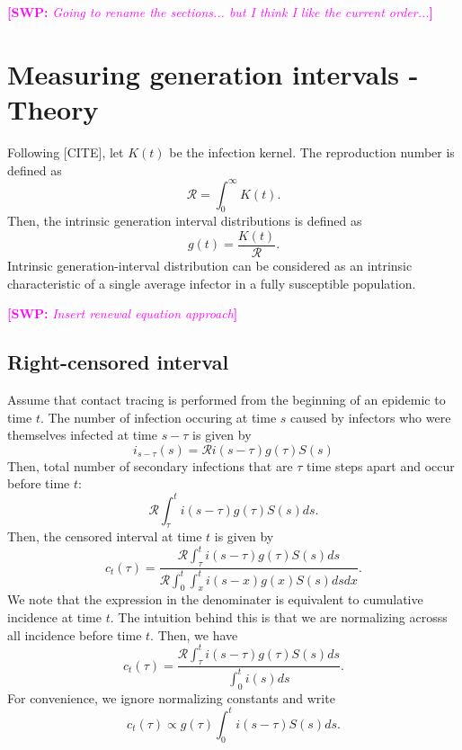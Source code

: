 \documentclass{article}
\newcommand{\RR}{\ensuremath{{\mathcal R}}}
\newcommand{\comment}[3]{\textcolor{#1}{\textbf{[#2: }\textsl{#3}\textbf{]}}}
\newcommand{\swp}[1]{\comment{magenta}{SWP}{#1}}
\begin{document}
\swp{Going to rename the sections... but I think I like the current order...}
\section{Measuring generation intervals - Theory}

Following [CITE], let $K(t)$ be the infection kernel. 
The reproduction number is defined as
$$
\RR = \int_0^\infty K(t).
$$
Then, the intrinsic generation interval distributions is defined as
$$
g(t) = \frac{K(t)}{\RR}.
$$
Intrinsic generation-interval distribution can be considered as an intrinsic characteristic of a single average infector in a fully susceptible population.

\swp{Insert renewal equation approach}

\subsection{Right-censored interval}

Assume that contact tracing is performed from the beginning of an epidemic to time $t$.
The number of infection occuring at time $s$ caused by infectors who were themselves infected at time $s-\tau$ is given by
\begin{equation}
i_{s-\tau}(s) = \RR i(s-\tau) g(\tau) S(s)
\end{equation}
Then, total number of secondary infections that are $\tau$ time steps apart and occur before time $t$:
\begin{equation}
\RR \int_\tau^t i(s-\tau) g(\tau) S(s) ds.
\end{equation}
Then, the censored interval at time $t$ is given by
\begin{equation}
c_t(\tau)= \frac{\RR \int_\tau^t i(s-\tau) g(\tau) S(s) ds}{\RR \int_0^t \int_x^t i(s-x) g(x) S(s) ds dx}.
\end{equation}
We note that the expression in the denominater is equivalent to cumulative incidence at time $t$.
The intuition behind this is that we are normalizing acrosss all incidence before time $t$.
Then, we have
\begin{equation}
c_t(\tau) = \frac{\RR \int_\tau^t i(s-\tau) g(\tau) S(s) ds}{\int_0^t i(s) ds}.
\end{equation}
For convenience, we ignore normalizing constants and write
\begin{equation}\label{eq:obsg}
c_t(\tau) \propto g(\tau) \int_{0}^t i(s-\tau) S(s) ds.
\end{equation}
\end{document}
